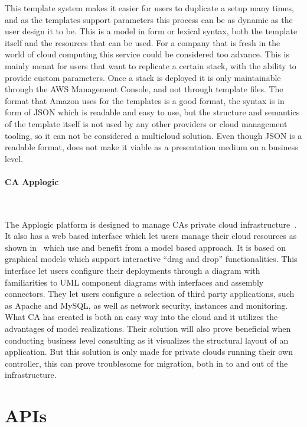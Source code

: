 This template system makes it easier for users to duplicate a setup many times, 
and as the templates support parameters this process can be as dynamic as the user design it to be. 
This is a model in form or lexical syntax, both the template itself and the resources that can be used.
For a company that is fresh in the world of cloud computing this service could be considered too advance. 
This is mainly meant for users that want to replicate a certain stack, with the ability to provide custom parameters. 
Once a stack is deployed it is only maintainable through the AWS Management Console, and not through template files. 
The format that Amazon uses for the templates is a good format, the syntax is in form of JSON which is readable and easy to use, 
but the structure and semantics of the template itself is not used by any other providers or cloud management tooling, 
so it can not be considered a multicloud solution. Even though JSON is a readable format, does not make it viable as a presentation medium on a business level.

\paragraph{CA Applogic}~\cite{applogic}



The Applogic platform is designed to manage CAs private cloud infrastructure~\cite{introducing-cloud-services}.
It also has a web based interface which let users manage their cloud resources 
as shown in~ which use and benefit from a model based approach.
It is based on graphical models which support interactive ``drag and drop'' functionalities.
This interface let users configure their deployments through a diagram with familiarities to 
UML component diagrams with interfaces and assembly connectors. 
They let users configure a selection of third party applications, 
such as Apache and MySQL, as well as network security, instances and monitoring. 
What CA has created is both an easy way into the cloud and it utilizes the advantages of model realizations. 
Their solution will also prove beneficial when conducting business level consulting
as it visualizes the structural layout of an application.
But this solution is only made for private clouds running their own controller, 
this can prove troublesome for migration, both in to and out of the infrastructure.

\section{APIs}

